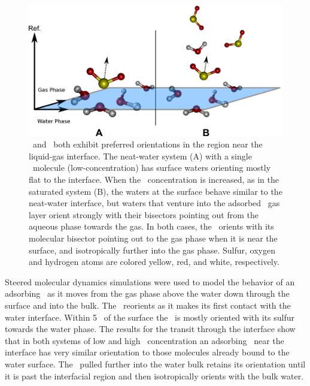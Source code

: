 \begin{figure}[h!]
	\begin{center}
		\includegraphics[scale=1.0]{images/angle-cartoons/system-surface.png}
		\caption{\wat~and \suldiox~both exhibit preferred orientations in the region near the liquid-gas interface. The neat-water system (A) with a single \suldiox~molecule (low-concentration) has surface waters orienting mostly flat to the interface. When the \suldiox~concentration is increased, as in the saturated system (B), the waters at the surface behave similar to the neat-water interface, but waters that venture into the adsorbed \suldiox~gas layer orient strongly with their bisectors pointing out from the aqueous phase towards the gas. In both cases, the \suldiox~orients with its molecular bisector pointing out to the gas phase when it is near the surface, and isotropically further into the gas phase. Sulfur, oxygen and hydrogen atoms are colored yellow, red, and white, respectively.}
		\label{fig:so2-surface-cartoon}
	\end{center}
\end{figure}

Steered molecular dynamics simulations were used to model the behavior of an adsorbing \suldiox~as it moves from the gas phase above the water down through the surface and into the bulk. The \suldiox~reorients as it makes its first contact with the water interface. Within 5 \angs~of the surface the \suldiox~is mostly oriented with its sulfur towards the water phase. The results for the transit through the interface show that in both systems of low and high \suldiox~concentration an adsorbing \suldiox~near the interface has very similar orientation to those molecules already bound to the water surface. The \suldiox~pulled further into the water bulk retains its orientation until it is past the interfacial region and then isotropically orients with the bulk water.

